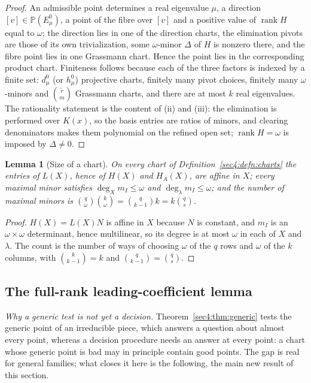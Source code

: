\documentclass[journal]{IEEEtran}
\theoremstyle{plainn}
\newtheorem{lem}[thm]{Lemma}
\theoremstyle{remark}
\newcommand{\rank}{\operatorname{rank}}
\begin{document}
\begin{proof}
An admissible point determines a real eigenvalue $\mu$, a direction $[v]\in\mathbb P(E_\mu^0)$, a point
of the fibre over $[v]$ and a positive value of $\rank H$ equal to $\omega$; the direction lies in one
of the direction charts, the elimination pivots are those of its own trivialization, some
$\omega$-minor $\Delta$ of $H$ is nonzero there, and the fibre point lies in one Grassmann chart. Hence
the point lies in the corresponding product chart. Finiteness follows because each of the three factors
is indexed by a finite set: $d_\mu^0$ (or $h_\mu^0$) projective charts, finitely many pivot choices,
finitely many $\omega$-minors and $\binom{\widetilde r}{m}$ Grassmann charts, and there are at most $k$
real eigenvalues. The rationality statement is the content of (ii) and (iii): the elimination is
performed over $K(x)$, so the basis entries are ratios of minors, and clearing denominators makes them
polynomial on the refined open set; $\rank H=\omega$ is imposed by $\Delta\ne0$.
\end{proof}

\begin{lem}[Size of a chart]
\label{sec4:lem:minorcount}
On every chart of Definition~\ref{sec4:defn:charts} the entries of $L(X)$, hence of $H(X)$ and
$H_A(X)$, are affine in $X$; every maximal minor satisfies $\deg_X m_I\le\omega$ and
$\deg_\lambda m_I\le\omega$; and the number of maximal minors is
$\binom{q}{\omega}\binom{k}{\omega}=\binom{q}{k-1}k=k\binom{q}{s}$.
\end{lem}

\begin{proof}
$H(X)=L(X)N$ is affine in $X$ because $N$ is constant, and $m_I$ is an $\omega\times\omega$
determinant, hence multilinear, so its degree is at most $\omega$ in each of $X$ and $\lambda$. The
count is the number of ways of choosing $\omega$ of the $q$ rows and $\omega$ of the $k$ columns,
with $\binom{k}{k-1}=k$ and $\binom{q}{k-1}=\binom{q}{s}$.
\end{proof}

\subsection{The full-rank leading-coefficient lemma}
\label{sec4:fullrank}

\emph{Why a generic test is not yet a decision.} Theorem~\ref{sec4:thm:generic} tests the generic point
of an irreducible piece, which answers a question about almost every point, whereas a decision
procedure needs an answer at every point: a chart whose generic point is bad may in principle contain
good points. The gap is real for general families; what closes it here is the following, the main new
result of this section.
\end{document}
